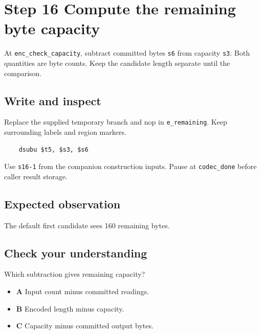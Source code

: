 \section{Step 16 Compute the remaining byte capacity}\label{delta-s16}

At \texttt{enc\_check\_capacity}, subtract committed bytes \texttt{s6} from capacity \texttt{s3}. Both quantities are byte counts. Keep the candidate length separate until the comparison.

\subsection{Write and inspect}
Replace the supplied temporary branch and nop in \texttt{e\_remaining}. Keep surrounding labels and region markers.

\begin{verbatim}
    dsubu $t5, $s3, $s6
\end{verbatim}
Use \texttt{s16-1} from the companion construction inputs. Pause at \texttt{codec\_done} before caller result storage.

\subsection{Expected observation}
The default first candidate sees 160 remaining bytes.

\subsection{Check your understanding}
Which subtraction gives remaining capacity?

\begin{itemize}
  \item \textbf{A} Input count minus committed readings.
  \item \textbf{B} Encoded length minus capacity.
  \item \textbf{C} Capacity minus committed output bytes.
\end{itemize}
